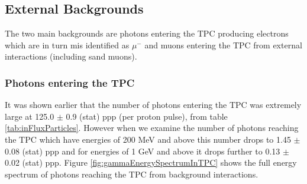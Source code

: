 \subsection{External Backgrounds}
The two main backgrounds are photons entering the TPC producing electrons which are in turn mis identified as $\mu^{-}$ and muons entering the TPC from external interactions (including sand muons). 

\subsubsection{Photons entering the TPC}
It was shown earlier that the number of photons entering the TPC was extremely large at 125.0 $\pm$ 0.9 (stat) ppp (per proton pulse), from table \ref{tab:inFluxParticles}. However when we examine the number of photons reaching the TPC which have energies of 200 MeV and above this number drops to 1.45 $\pm$ 0.08 (stat) ppp and for energies of 1 GeV and above it drops further to 0.13 $\pm$ 0.02 (stat) ppp. Figure \ref{fig:gammaEnergySpectrumInTPC} shows the full energy spectrum of photons reaching the TPC from background interactions. 

